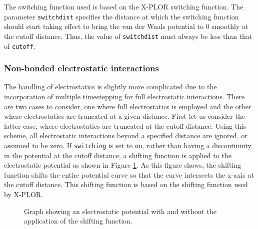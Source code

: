 The switching function used is based on the X-PLOR switching
function.  The parameter {\tt switchdist} specifies the distance
at which the switching function should start taking effect to
bring the van der Waals potential to 0 smoothly at the cutoff distance.  
Thus, the value of {\tt switchdist} must always be less than that 
of {\tt cutoff}.


\subsubsection{Non-bonded electrostatic interactions}
The handling of electrostatics is slightly
more complicated due to the incorporation of multiple timestepping for full
electrostatic interactions.  There are two cases to consider, one where
full electrostatics is employed and the other where electrostatics
are truncated at a given distance.
\prettypar
First let us consider the latter case, where electrostatics are truncated at
the cutoff distance.  Using this scheme, all electrostatic interactions
beyond a specified distance are ignored, or assumed to be zero.  If
{\tt switching} is set to {\tt on}, rather than having a discontinuity
in the potential
at the cutoff distance, a shifting function is applied to the electrostatic
potential as shown in Figure \ref{fig:shifting}.  As this figure shows, the
shifting function shifts the entire potential curve so that the curve
intersects the x-axis at the cutoff distance.  This shifting function
is based on the
shifting function used by X-PLOR.

\begin{figure}[htb]
  \caption[Graph of electrostatic potential with and without shifting function]
  {\small Graph showing an electrostatic potential with and without the
  application of the shifting function.}
  \label{fig:shifting}
\end{figure}

